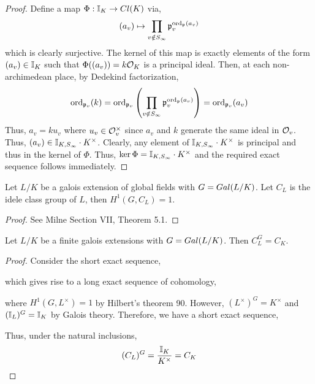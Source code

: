 \documentclass[12pt]{extarticle}
\begin{document}
\begin{proof}
Define a map $\Phi : \mathbb{I}_{K} \to Cl(K)$ via,
\[ (a_v) \mapsto \prod_{v \notin S_{\infty}} \mathfrak{p}_v^{\mathrm{ord}_{\mathfrak{p}}(a_v)} \]
which is clearly surjective.
The kernel of this map is exactly elements of the form $(a_v) \in \mathbb{I}_{K}$ such that $\Phi((a_v)) = k \mathcal{O}_{K}$ is a principal ideal. Then, at each non-archimedean place, by Dedekind factorization,
\[ \mathrm{ord}_{\mathfrak{p}_v}(k) = \mathrm{ord}_{\mathfrak{p}_v} \left( \prod_{v \notin S_{\infty}} \mathfrak{p}_v^{\mathrm{ord}_{\mathfrak{p}}(a_v)} \right) = \mathrm{ord}_{\mathfrak{p}_v}(a_v) \] 
Thus, $a_v = k u_v$ where $u_v \in \mathcal{O}_{v}^\times$ since $a_v$ and $k$ generate the same ideal in $\mathcal{O}_{v}$. Thus, $(a_v) \in \mathbb{I}_{K, S_\infty} \cdot K^\times$. Clearly, any element of $\mathbb{I}_{K, S_\infty} \cdot K^\times$ is principal and thus in the kernel of $\Phi$. Thus, $\ker{\Phi} = \mathbb{I}_{K, S_\infty} \cdot K^\times$ and the required exact sequence follows immediately.  
\end{proof}

\begin{lemma} \label{trivial_idele_class_homology}
Let $L/K$ be a galois extension of global fields with $G = Gal \small(L/K \small)$. Let $C_L$ is the idele class group of $L$, then $H^1(G, C_L) = 1$. 
\end{lemma}

\begin{proof}
See Milne Section VII, Theorem 5.1. 
\end{proof}

\begin{lemma} \label{fixed_idele}
Let $L/K$ be a finite galois extensions with $G = Gal \small(L/K \small)$. Then $C_L^G = C_K$.  
\end{lemma}

\begin{proof}
Consider the short exact sequence,
\begin{center}
\end{center}
which gives rise to a long exact sequence of cohomology,
\begin{center}
\end{center}
where $H^1(G, L^\times) = 1$ by Hilbert's theorem 90. However, $(L^\times)^G = K^\times$ and $(\mathbb{I}_{L})^G = \mathbb{I}_{K}$ by Galois theory. Therefore, we have a short exact sequence, 
\begin{center}
\end{center}
Thus, under the natural inclusions,
\[ (C_L)^G = \frac{\mathbb{I}_{K}}{K^\times} = C_K \]
\end{proof}
\end{document}
